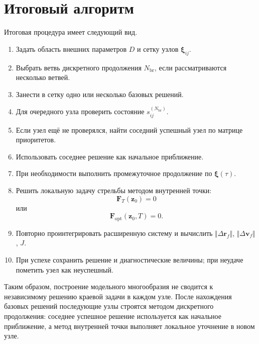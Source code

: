 \section*{Итоговый алгоритм}

Итоговая процедура имеет следующий вид.

\begin{enumerate}
	\item Задать область внешних параметров \(D\) и сетку узлов \(\boldsymbol\xi_{ij}\).
	\item Выбрать ветвь дискретного продолжения \(N_{\mathrm{br}}\), если рассматриваются несколько ветвей.
	\item Занести в сетку одно или несколько базовых решений.
	\item Для очередного узла проверить состояние \(s_{ij}^{(N_{\mathrm{br}})}\).
	\item Если узел ещё не проверялся, найти соседний успешный узел по матрице приоритетов.
	\item Использовать соседнее решение как начальное приближение.
	\item При необходимости выполнить промежуточное продолжение по \(\boldsymbol\xi(\tau)\).
	\item Решить локальную задачу стрельбы методом внутренней точки:
	\begin{equation}
		\mathbf F_T(\mathbf z_0)=0
	\end{equation}
	или
	\begin{equation}
		\mathbf F_{\mathrm{opt}}(\mathbf z_0,T)=0.
	\end{equation}
	\item Повторно проинтегрировать расширенную систему и вычислить \(\Vert\Delta\mathbf r_f\Vert\), \(\Vert\Delta\mathbf v_f\Vert\), \(J\).
	\item При успехе сохранить решение и диагностические величины; при неудаче пометить узел как неуспешный.
\end{enumerate}

Таким образом, построение модельного многообразия не сводится к независимому решению краевой задачи в каждом узле. После нахождения базовых решений последующие узлы строятся методом дискретного продолжения: соседнее успешное решение используется как начальное приближение, а метод внутренней точки выполняет локальное уточнение в новом узле.